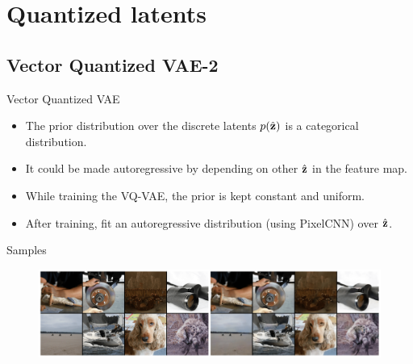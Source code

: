 \documentclass{beamer}
\begin{document}
\section{Quantized latents}
\subsection{Vector Quantized VAE-2}
\begin{frame}{Vector Quantized VAE}
	\begin{itemize}
		\item The prior distribution over the discrete latents $p(\hat{\mathbf{z}})$ is a categorical distribution.
		\item It could be made autoregressive by depending on other $\hat{\mathbf{z}}$ in the feature map. 
		\item While training the VQ-VAE, the prior is kept constant and uniform. 
		\item After training, fit an autoregressive distribution (using PixelCNN) over $\hat{\mathbf{z}}$.
	\end{itemize}
	\begin{block}{Samples}
		\begin{figure}
			\centering
			\includegraphics[width=\linewidth]{figs/vqvae_results}
		\end{figure}
	\end{block}

\end{frame}
\end{document}
